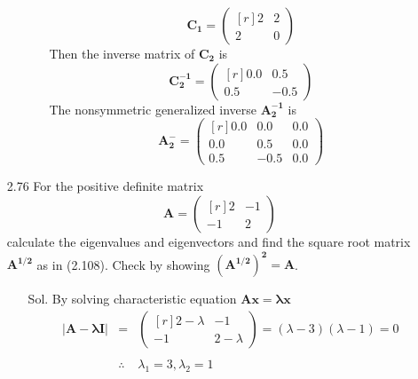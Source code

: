 \documentclass[12pt]{article} %
\begin{document}
\begin{enumerate}
\begin{enumerate}
\begin{enumerate}
				$$
					\mathbf{C_{1}}=
					\begin{pmatrix}[r]
					2 & 2 \\
					2 & 0  
					\end{pmatrix}
				$$
				Then the inverse matrix of $\mathbf{C_2}$ is				
				$$
					\mathbf{C_{2}^{-1}}=
					\begin{pmatrix}[r]
					0.0 &  0.5 \\
				    0.5 & -0.5  
					\end{pmatrix}
				$$					
				The nonsymmetric generalized inverse $\mathbf{A_{2}^{-1}}$ is		
				$$
					\mathbf{A_{2}^{-}}=
					\begin{pmatrix}[r]
					0.0 & 0.0 & 0.0 \\
					0.0 & 0.5 & 0.0 \\
					0.5 & -0.5 & 0.0 
					\end{pmatrix}
				$$											
			\end{enumerate}
		\end{enumerate}
\item	[2.76] For the positive definite matrix		
$$
	\mathbf{A}=
	\begin{pmatrix}[r]
		 2 & -1 \\
		-1 &  2  
	\end{pmatrix}
$$	
calculate the eigenvalues and eigenvectors 
and find the square root matrix $\mathbf{A^{1/2}}$ as in (2.108). 
Check by showing $\mathbf{(A^{1/2})^{2}=A}$.
	\begin{enumerate}
		\item[Sol.] By solving characteristic equation $\mathbf{Ax=\lambda x}$ 
		\begin{eqnarray*}
			\mathbf{|A-\lambda I|}&=&
				\begin{pmatrix}[r]
					 2-\lambda & -1 \\
					-1 & 2-\lambda  
				\end{pmatrix}
			=(\lambda-3)(\lambda-1)=0\\
			\\
			&\therefore& \lambda_{1}=3,   \lambda_{2}=1
		\end{eqnarray*}	
			

\end{enumerate}
\end{enumerate}
\end{document}
